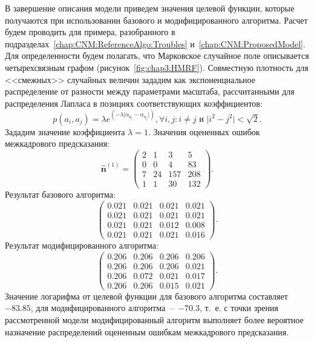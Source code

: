 В завершение описания модели приведем значения целевой функции, которые получаются при использовании базового и модифицированного алгоритма. Расчет будем проводить для примера, разобранного в подразделах~\ref{chap:CNM:ReferenceAlgo:Troubles} и~\ref{chap:CNM:ProposedModel}. Для определенности будем полагать, что Марковское случайное поле описывается четырехсвязным графом (рисунок~\ref{fig:chap3:HMRF}). Совместную плотность для <<смежных>> случайных величин зададим как экспоненциальное распределение от разности между параметрами масштаба, рассчитанными для распределения Лапласа в позициях соответствующих коэффициентов:
\begin{equation*}
p(a_i,a_j) = \lambda e^{(-\lambda \vert \alpha_{a_i} - \alpha_{a_j} \vert)}, \forall i,j : i \neq j\text{ и }\vert i^2-j^2 \vert <\sqrt{2}.
\end{equation*}
Зададим значение коэффициента $\lambda=1$.
Значения оцененных ошибок межкадрового предсказания:
\begin{equation*}
\hat{\mathbf{n}}^{(1)} = 
\left(
\begin{matrix}
2 &  1 &   3 &   5 \\
0 &  0 &   4 &  83 \\
7 & 24 & 157 & 208 \\
1 &  1 &  30 & 132
\end{matrix}
\right).
\end{equation*}
Результат базового алгоритма:
\begin{equation*}
\left(
\begin{matrix}
0.021 & 0.021 & 0.021 & 0.021 \\
0.021 & 0.021 & 0.021 & 0.021 \\
0.021 & 0.021 & 0.012 & 0.008 \\
0.021 & 0.021 & 0.021 & 0.016
\end{matrix}
\right).
\end{equation*}
Результат модифицированного алгоритма:
\begin{equation*}
\left(
\begin{matrix}
0.206  & 0.206 & 0.206 & 0.206 \\
0.206  & 0.206 & 0.206 & 0.021 \\
0.206  & 0.072 & 0.021 & 0.017 \\
0.206  & 0.206 & 0.015 & 0.021
\end{matrix}
\right).
\end{equation*}
Значение логарифма от целевой функции для базового алгоритма составляет $-83.85$, для модифицированного алгоритма~--~$-70.3$, т.~е. с точки зрения рассмотренной модели модифицированный алгоритм выполняет более вероятное назначение распределений оцененным ошибкам межкадрового предсказания.

